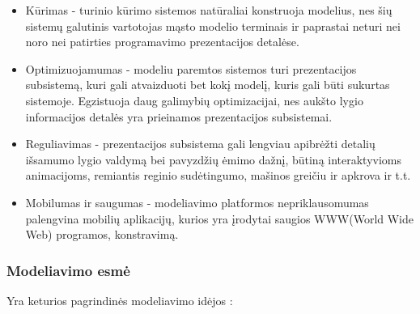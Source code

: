 \begin{itemize}

	\item Kūrimas - turinio kūrimo sistemos natūraliai konstruoja modelius, nes šių sistemų galutinis vartotojas mąsto modelio terminais ir paprastai neturi nei noro nei patirties programavimo prezentacijos detalėse.

	\item Optimizuojamumas - modeliu paremtos sistemos turi prezentacijos subsistemą, kuri gali atvaizduoti bet kokį modelį, kuris gali būti sukurtas sistemoje. Egzistuoja daug galimybių optimizacijai, nes aukšto lygio informacijos detalės yra prieinamos prezentacijos subsistemai.

	\item Reguliavimas - prezentacijos subsistema gali lengviau apibrėžti detalių išsamumo lygio valdymą bei pavyzdžių ėmimo dažnį, būtiną interaktyvioms animacijoms, remiantis reginio sudėtingumo, mašinos greičiu ir apkrova ir t.t.

	\item Mobilumas ir saugumas - modeliavimo platformos nepriklausomumas palengvina mobilių aplikacijų, kurios yra įrodytai saugios WWW(World Wide Web) programos, konstravimą.

\end{itemize}

\subsubsection{Modeliavimo esmė}

Yra keturios pagrindinės modeliavimo idėjos \cite{ElliottHudak97:Fran}:

